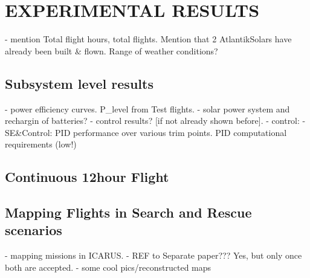  \section{EXPERIMENTAL RESULTS}
 - mention Total flight hours, total flights. Mention that 2 AtlantikSolars have already been built \& flown.  Range of weather conditions?
 \subsection{Subsystem level results}
    - power efficiency curves. P\_level from Test flights.
    - solar power system and rechargin of batteries?
    - control results? [if not already shown before].   - control:   - SE\&Control: PID performance over various trim points. PID computational requirements (low!)
  \subsection{Continuous 12hour Flight}
  \subsection{Mapping Flights in Search and Rescue scenarios}
    - mapping missions in ICARUS. 
    - REF to Separate paper??? Yes, but only once both are accepted.
    - some cool pics/reconstructed maps